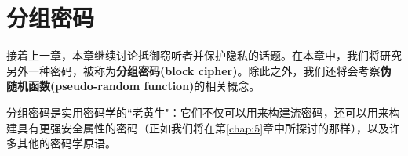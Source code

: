 \chapter{分组密码}

接着上一章，本章继续讨论抵御窃听者并保护隐私的话题。在本章中，我们将研究另外一种密码，被称为\textbf{分组密码(block cipher)}。除此之外，我们还将会考察\textbf{伪随机函数(pseudo-random function)}的相关概念。

分组密码是实用密码学的``老黄牛"：它们不仅可以用来构建流密码，还可以用来构建具有更强安全属性的密码（正如我们将在第\ref{chap:5}章中所探讨的那样），以及许多其他的密码学原语。











